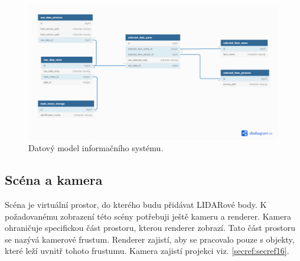 \documentclass[czech,bachelor,dept420,male,cpdeclaration]{diploma}
\begin{document}

\begin{figure}[H]
\includegraphics[width=\linewidth]{Figures/dataModel.png}
\caption{Datový model informačního systému. }
\label{fig:datamodel}
\end{figure} 



\subsection{Scéna a kamera} 
Scéna je virtuální prostor, do kterého budu přidávat LIDARové body. K požadovanému zobrazení této scény potřebuji ještě kameru a renderer. Kamera ohraničuje specifickou část prostoru, kterou renderer zobrazí. Tato část prostoru se nazývá kamerové frustum. Renderer zajistí, aby se pracovalo pouze s objekty, které leží uvnitř tohoto frustumu. Kamera zajistí projekci viz. \ref{secref:secref16}. 

\begin{minipage}{\linewidth} 
 
\end{minipage} 
\end{document}
